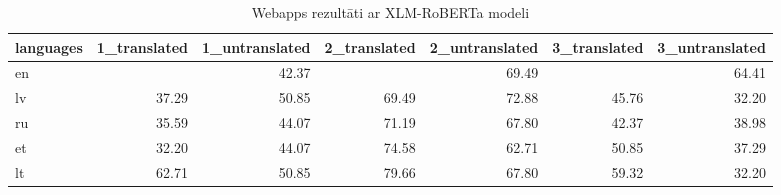 \begin{table}[htbp]
  \centering
  \caption{Webapps rezultāti ar XLM-RoBERTa modeli}
    \begin{tabular}{lrrrrrr}\toprule
    languages & 1\_translated & 1\_untranslated & 2\_translated & 2\_untranslated & 3\_translated & 3\_untranslated \\\midrule
    en    &       & \cellcolor[rgb]{ .98,  .725,  .733}42.37 &       & \cellcolor[rgb]{ .58,  .702,  .859}69.49 &       & \cellcolor[rgb]{ .69,  .78,  .898}64.41 \\
    lv    & \cellcolor[rgb]{ .976,  .569,  .576}37.29 & \cellcolor[rgb]{ .988,  .988,  1}50.85 & \cellcolor[rgb]{ .58,  .702,  .859}69.49 & \cellcolor[rgb]{ .506,  .647,  .831}72.88 & \cellcolor[rgb]{ .98,  .827,  .839}45.76 & \cellcolor[rgb]{ .973,  .412,  .42}32.20 \\
    ru    & \cellcolor[rgb]{ .973,  .514,  .522}35.59 & \cellcolor[rgb]{ .98,  .776,  .788}44.07 & \cellcolor[rgb]{ .541,  .675,  .843}71.19 & \cellcolor[rgb]{ .616,  .725,  .871}67.80 & \cellcolor[rgb]{ .98,  .725,  .733}42.37 & \cellcolor[rgb]{ .976,  .62,  .627}38.98 \\
    et    & \cellcolor[rgb]{ .973,  .412,  .42}32.20 & \cellcolor[rgb]{ .98,  .776,  .788}44.07 & \cellcolor[rgb]{ .467,  .624,  .82}74.58 & \cellcolor[rgb]{ .729,  .808,  .91}62.71 & \cellcolor[rgb]{ .988,  .988,  1}50.85 & \cellcolor[rgb]{ .976,  .569,  .576}37.29 \\
    lt    & \cellcolor[rgb]{ .729,  .808,  .91}62.71 & \cellcolor[rgb]{ .988,  .988,  1}50.85 & \cellcolor[rgb]{ .353,  .541,  .776}79.66 & \cellcolor[rgb]{ .616,  .725,  .871}67.80 & \cellcolor[rgb]{ .804,  .859,  .937}59.32 & \cellcolor[rgb]{ .973,  .412,  .42}32.20 \\\bottomrule
    \end{tabular}%
  \label{tab:webapps-xml}%
\end{table}%


